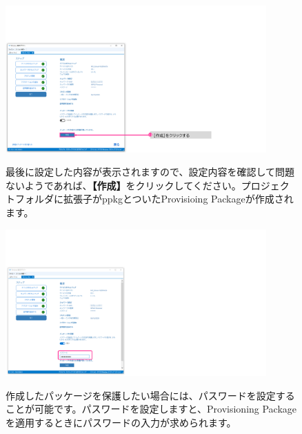 \begin{figure}[hp]
    \begin{minipage}{0.6\textwidth}
        \vspace{-1cm}
        \includegraphics[width=10cm]{figures/MakeProvisioningPackage-16}
    \end{minipage}
    \begin{minipage}{0.4\textwidth}
       最後に設定した内容が表示されますので、設定内容を確認して問題ないようであれば、\textbf{【作成】}をクリックしてください。プロジェクトフォルダに拡張子がppkgとついたProvisioing Packageが作成されます。
    \end{minipage}
\end{figure}

\begin{figure}[hp]
    \begin{minipage}{0.6\textwidth}
        \vspace{-1cm}
        \includegraphics[width=10cm]{figures/MakeProvisioningPackage-17}
    \end{minipage}
    \begin{minipage}{0.4\textwidth}
       作成したパッケージを保護したい場合には、パスワードを設定することが可能です。パスワードを設定しますと、Provisioning Package を適用するときにパスワードの入力が求められます。
    \end{minipage}
    \vspace{8cm}
\end{figure}


